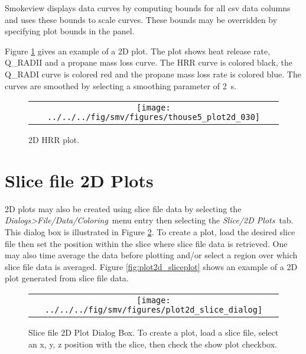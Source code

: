 \documentclass[11pt,twoside]{book}
\newcommand{\frameit}[1]{\fbox{\tt #1}}
\begin{document}
Smokeview displays data curves by computing bounds for all csv data columns and uses these bounds to scale curves.  These bounds may be overridden by specifying plot bounds in the
\frameit{plot bounds} panel.

Figure \ref{fig:plot2d_hrrplot} gives an example of a 2D plot.  The plot shows
heat release rate, Q\_RADII and
a propane mass loss curve.  The HRR curve is colored black, the Q\_RADI curve is colored red and the propane mass loss rate is colored blue.
The curves are smoothed by selecting a smoothing parameter of 2~s.

\begin{figure}[htbp]
\begin{center}
\begin{tabular}{c}
\texttt{[image: ../../../fig/smv/figures/thouse5\_plot2d\_030]}
\end{tabular}
\end{center}
\caption{2D HRR plot.}
\label{fig:plot2d_hrrplot}%
\end{figure}

\section{Slice file 2D Plots}
2D plots may also be created using slice file data by selecting the
{\em Dialogs>File/Data/Coloring}\ menu entry then selecting the
{\em Slice/2D Plots}\ tab. This dialog box is illustrated in
Figure \ref{fig:plot2dslicedialog}. To create a plot,
load the desired slice file then set the position within the slice where
slice file data is retrieved.  One may also
time average the data before plotting and/or select a region
over which slice file data is averaged.
Figure \ref{fig:plot2d_sliceplot} shows an example of a 2D plot
generated from slice file data.


\begin{figure}[htbp]
\begin{center}
\begin{tabular}{c}
\texttt{[image: ../../../fig/smv/figures/plot2d\_slice\_dialog]}
\end{tabular}
\end{center}
\caption[Slice file 2D Plot Dialog Box.]{Slice file 2D Plot Dialog Box.
To create a plot, load a slice file, select an x, y, z position with the slice,
then check the show plot checkbox.}
\label{fig:plot2dslicedialog}%
\end{figure}
\end{document}

